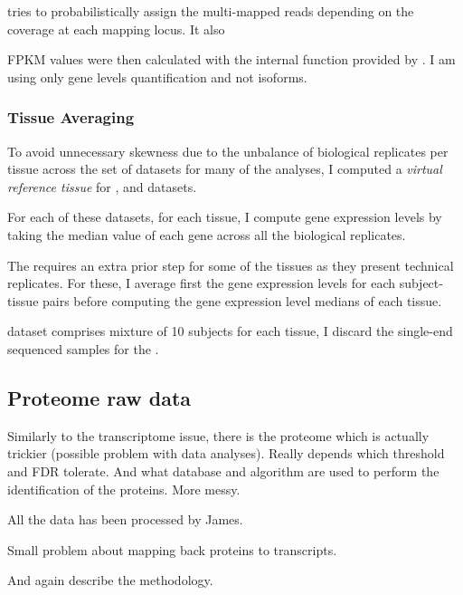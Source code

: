 tries to probabilistically assign the multi-mapped reads
depending on the coverage at each mapping locus. It also


\gls{FPKM}
values were then calculated with the internal function provided by \irap.
I am using only gene levels quantification and not isoforms.


\subsubsection{Tissue Averaging}

To avoid unnecessary skewness due to the unbalance of biological replicates per
tissue across the set of datasets for many of the analyses, 
I computed a \emph{virtual reference tissue}
for ,  and  datasets.

For each of these datasets, for each tissue, I compute gene expression levels by
taking the median value of each gene across all the biological replicates.

The  requires an extra prior step for some of the tissues as they
present technical replicates. For these, I average first the gene expression levels
for each subject-tissue pairs before computing the gene expression level medians
of each tissue.

\NB {} dataset comprises mixture of 10 subjects for each tissue, I
discard the single-end sequenced samples for the .





\subsection{Proteome raw data}

Similarly to the transcriptome issue, there is the proteome which is actually
trickier (possible problem with  data analyses). Really depends which
threshold and \gls{FDR} tolerate. And what database and algorithm are used to perform
the identification of the proteins. More messy.

All the data has been processed by James.

Small problem about mapping back proteins to transcripts.



And again describe the methodology.

